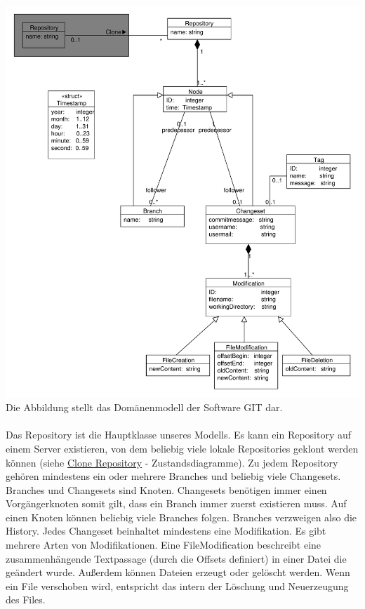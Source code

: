 \documentclass[a4paper]{article}
\begin{document}
\includegraphics[width=\textwidth]{Domaenenmodell.pdf}\\
Die Abbildung stellt das Domänenmodell der Software GIT dar.\\\\

Das Repository ist die Hauptklasse unseres Modells. Es kann ein Repository auf einem Server existieren, von dem beliebig viele lokale Repositories geklont werden können (siehe \hyperlink{target}{Clone Repository} - Zustandsdiagramme). Zu jedem Repository gehören mindestens ein oder mehrere Branches und beliebig viele \gls{Changeset}s. Branches und Changesets sind Knoten. Changesets benötigen immer einen Vorgängerknoten somit gilt, dass ein Branch immer zuerst existieren muss. Auf einen Knoten können beliebig viele Branches folgen. Branches verzweigen also die History. Jedes Changeset beinhaltet mindestens eine Modifikation. Es gibt mehrere Arten von Modifikationen. Eine FileModification beschreibt eine zusammenhängende Textpassage (durch die Offsets definiert) in einer Datei die geändert wurde. Außerdem können Dateien erzeugt oder gelöscht werden. Wenn ein File verschoben wird, entspricht das intern der Löschung und Neuerzeugung des Files.
\end{document}
